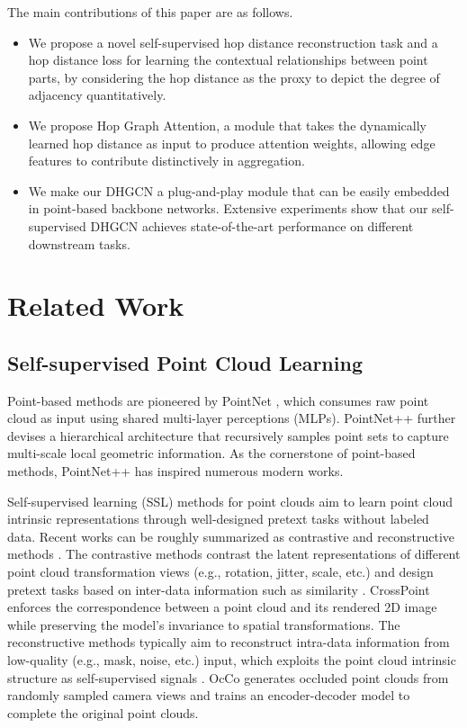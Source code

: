 \documentclass[letterpaper]{article}
\begin{document}
The main contributions of this paper are as follows.
\begin{itemize}
\item We propose a novel self-supervised hop distance reconstruction task and a hop distance loss for learning the contextual relationships between point parts, by considering the hop distance as the proxy to depict the degree of adjacency quantitatively.
\item We propose Hop Graph Attention, a module that takes the dynamically learned hop distance as input to produce attention weights, allowing edge features to contribute distinctively in aggregation.
\item We make our DHGCN a plug-and-play module that can be easily embedded in point-based backbone networks.
Extensive experiments show that our self-supervised DHGCN achieves state-of-the-art performance on different downstream tasks.
\end{itemize}

\section{Related Work}

\subsection{Self-supervised Point Cloud Learning}
Point-based methods are pioneered by PointNet \cite{qi2017pointnet}, which consumes raw point cloud as input using shared multi-layer perceptions (MLPs).
PointNet++ \cite{pointnet++} further devises a hierarchical architecture that recursively samples point sets to capture multi-scale local geometric information.
As the cornerstone of point-based methods, PointNet++ has inspired numerous modern works.

Self-supervised learning (SSL) methods for point clouds aim to learn point cloud intrinsic representations through well-designed pretext tasks without labeled data.
Recent works can be roughly summarized as contrastive and reconstructive methods \cite{wu2021self}.
The contrastive methods contrast the latent representations of different point cloud transformation views (e.g., rotation, jitter, scale, etc.) and design pretext tasks based on inter-data information such as similarity \cite{xie2020pointcontrast, chen20214dcontrast,gao2020graphter}.
CrossPoint \cite{afham2022crosspoint} enforces the correspondence between a point cloud and its rendered 2D image while preserving the model's invariance to spatial transformations.
The reconstructive methods typically aim to reconstruct intra-data information from low-quality (e.g., mask, noise, etc.) input, which exploits the point cloud intrinsic structure as self-supervised signals \cite{yang2018foldingnet, yu2022point, pang2022masked}.
OcCo \cite{wang2021unsupervised} generates occluded point clouds from randomly sampled camera views and trains an encoder-decoder model to complete the original point clouds.
\end{document}
